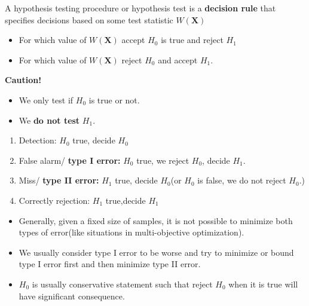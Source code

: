 \begin{refsection}
\begin{definition}
	A hypothesis testing procedure or hypothesis test is a \textbf{decision rule} that specifies decisions based on some test statistic $W(\bm{X})$
	\begin{itemize}
		\item For which value of $W(\bm{X})$ accept $H_0$ is true and reject $H_1$
		\item For which value of $W(\bm{X})$  reject $H_0$ and accept $H_1$.
	\end{itemize}
\end{definition}

\begin{mdframed}
	\textbf{Caution!}
	\begin{itemize}
		\item We only test if $H_0$ is true or not.
		\item We \textbf{do not test }$H_1$.
	\end{itemize}
\end{mdframed}

\begin{definition}\hfill
	\begin{enumerate}
		\item Detection: $H_0$ true, decide $H_0$
		\item False alarm/ \textbf{type I error:} $H_0$ true, we reject $H_0$, decide $H_1$. 
		\item Miss/ \textbf{type II error:} $H_1$ true, decide $H_0$(or $H_0$ is false, we do not reject $H_0$.)
		\item Correctly rejection: $H_1$ true,decide $H_1$
	\end{enumerate}
\end{definition}

\begin{remark}\cite[245]{hoggintroduction}\hfill
	\begin{itemize}
		\item Generally, given a fixed size of samples, it is not possible to minimize both types of error(like situations in multi-objective optimization).
		\item We usually consider type I error to be worse and try to minimize or bound type I error first and then minimize type II error.
		\item $H_0$ is usually conservative statement such that reject $H_0$ when it is true will have significant consequence. 	
	\end{itemize}
\end{remark}


\end{refsection}

